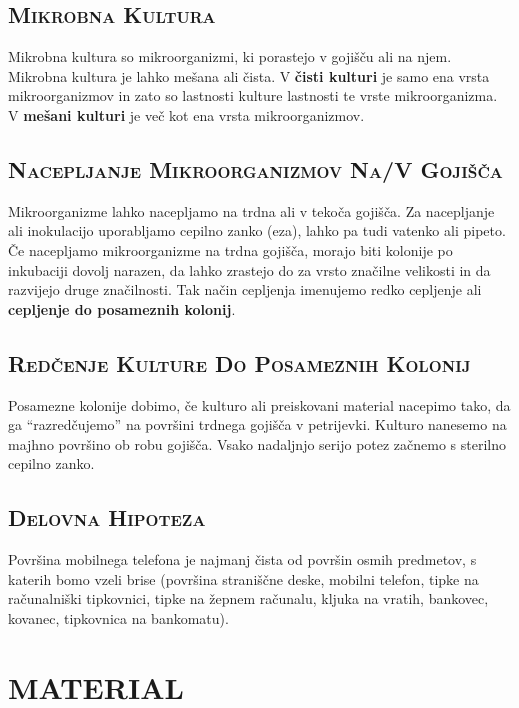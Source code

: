 \documentclass[12pt, a4paper]{report}
\begin{document}
\section{\textsc{Mikrobna Kultura}}

Mikrobna kultura so mikroorganizmi, ki porastejo v gojišču ali na njem. Mikrobna kultura je lahko mešana ali čista. V \textbf{čisti kulturi} je samo ena vrsta mikroorganizmov in zato so lastnosti kulture lastnosti te vrste mikroorganizma. V \textbf{mešani kulturi} je več kot ena vrsta mikroorganizmov.

\section{\textsc{Nacepljanje Mikroorganizmov Na/V Gojišča}}

Mikroorganizme lahko nacepljamo na trdna ali v tekoča gojišča. Za nacepljanje ali inokulacijo uporabljamo cepilno zanko (eza), lahko pa tudi vatenko ali pipeto. Če nacepljamo mikroorganizme na trdna gojišča, morajo biti kolonije po inkubaciji dovolj narazen, da lahko zrastejo do za vrsto značilne velikosti in da razvijejo druge značilnosti. Tak način cepljenja imenujemo redko cepljenje ali \textbf{cepljenje do posameznih kolonij}.

\section{\textsc{Redčenje Kulture Do Posameznih Kolonij}}

Posamezne kolonije dobimo, če kulturo ali preiskovani material nacepimo tako, da ga ``razredčujemo'' na površini trdnega gojišča v petrijevki. Kulturo nanesemo na majhno površino ob robu gojišča. Vsako nadaljnjo serijo potez začnemo s sterilno cepilno zanko.

\section{\textsc{Delovna Hipoteza}}

Površina mobilnega telefona je najmanj čista od površin osmih predmetov, s katerih bomo vzeli brise (površina straniščne deske, mobilni telefon, tipke na računalniški tipkovnici, tipke na žepnem računalu, kljuka na vratih, bankovec, kovanec, tipkovnica na bankomatu).

\chapter{MATERIAL}
\end{document}
